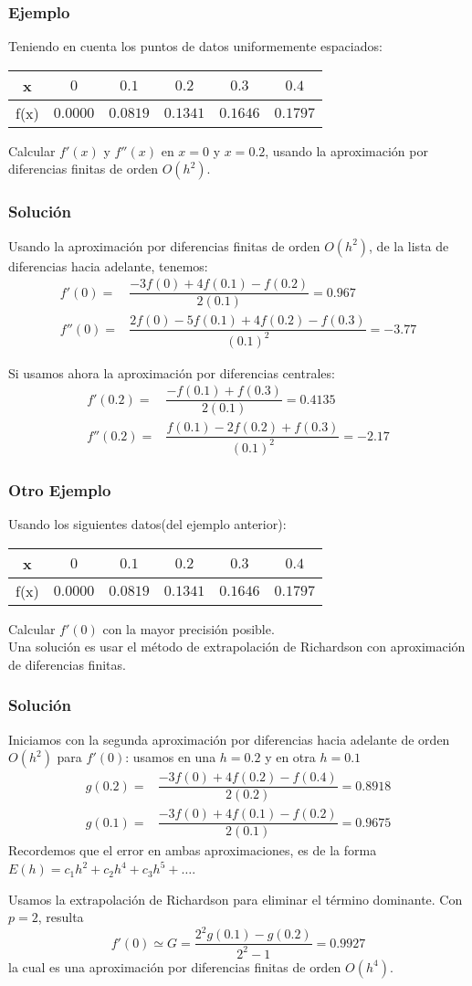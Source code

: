 \begin{frame}
\frametitle{Ejemplo}
Teniendo en cuenta los puntos de datos uniformemente espaciados:
\begin{center}
\begin{tabular}{c | c | c | c | c | c }
x & $0$ & $0.1$ & $0.2$ & $0.3$ & $0.4$ \\ \hline
f(x) & $0.0000$ & $0.0819$ & $0.1341$ & $0.1646$ & $0.1797$
\end{tabular}
\end{center}
Calcular $f'(x)$ y $f''(x)$ en $x=0$ y $x=0.2$, usando la aproximación por diferencias finitas de orden $O(h^{2})$.
\end{frame}
\begin{frame}
\frametitle{Solución}
Usando la aproximación por diferencias finitas de orden $O(h^{2})$, de la lista de diferencias hacia adelante, tenemos:
\[ \begin{split} 
f'(0) =& \dfrac{-3f(0) + 4f(0.1) - f(0.2)}{2(0.1)} = 0.967 \\
f''(0) =& \dfrac{2 f(0) - 5f(0.1) + 4f(0.2) - f(0.3)}{(0.1)^{2}} = -3.77
\end{split} \]
\end{frame}
\begin{frame}
Si usamos ahora la aproximación por diferencias centrales:
\[ \begin{split}
f'(0.2) =& \dfrac{-f(0.1) + f(0.3)}{2(0.1)} = 0.4135 \\
f''(0.2) =& \dfrac{f(0.1)-2f(0.2) + f(0.3)}{(0.1)^{2}} = -2.17
\end{split} \]
\end{frame}
\begin{frame}
\frametitle{Otro Ejemplo}
Usando los siguientes datos(del ejemplo anterior):
\begin{center}
\begin{tabular}{c | c | c | c | c | c }
x & $0$ & $0.1$ & $0.2$ & $0.3$ & $0.4$ \\ \hline
f(x) & $0.0000$ & $0.0819$ & $0.1341$ & $0.1646$ & $0.1797$
\end{tabular}
\end{center}
Calcular $f'(0)$ con la mayor precisión posible.
\\
\medskip
Una solución es usar el método de extrapolación de Richardson con aproximación de diferencias finitas.
\end{frame}
\begin{frame}
\frametitle{Solución}
Iniciamos con la segunda aproximación por diferencias hacia adelante de orden $O(h^{2})$ para $f'(0)$: usamos en una $h=0.2$ y en otra $h=0.1$
\[ \begin{split}
g(0.2) =& \dfrac{-3f(0) + 4f(0.2) - f(0.4)}{2(0.2)} = 0.8918 \\
g(0.1) =& \dfrac{-3f(0) + 4f(0.1) - f(0.2)}{2(0.1)} = 0.9675
\end{split} \]
Recordemos que el error en ambas aproximaciones, es de la forma $E(h) = c_{1}h^{2} + c_{2} h^{4} + c_{3}h^{5} + \ldots$. 
\end{frame}
\begin{frame}
Usamos la extrapolación de Richardson para eliminar el término dominante. Con $p=2$, resulta
\[ f'(0) \simeq G = \dfrac{2^{2}g(0.1)-g(0.2)}{2^{2}-1}=0.9927 \]
la cual es una aproximación por diferencias finitas de orden $O(h^{4})$.
\end{frame}

